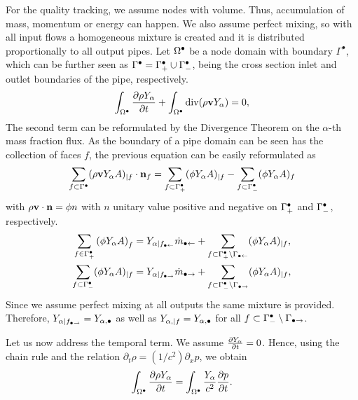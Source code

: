 For the quality tracking, we assume nodes with volume. Thus, accumulation of mass, momentum or energy can happen. We also assume perfect mixing, so with all input flows a homogeneous mixture is created and it is distributed proportionally to all output pipes. Let $\volnode$ be a node domain with boundary $\Gamma^\bullet$, which can be further seen as $\Gamma^\bullet = \GammaIn \cup \GammaOut$, being the cross section inlet and outlet boundaries of the pipe, respectively. 
\begin{equation}
    \int_{\volnode} \frac{\partial \rho \massfrac}{\partial t}+\int_{\volnode} \mathrm{div}(\rho \mathbf{v} \massfrac) =0,
\end{equation}
The second term can be reformulated by the Divergence Theorem on the $\alpha$-th mass fraction flux. As the boundary of a pipe domain can be seen has the collection of faces $f$, the previous equation can be easily reformulated as 
\begin{equation*}
    \sum_{\face \subset \Gamma^\bullet} (\rho \mathbf{v} \massfrac A)_{|\face} \cdot \normal_\face=\sum_{\face \subset \GammaIn} (\phi \massfrac A)_{|\face}-\sum_{\face \subset \GammaOut} (\phi \massfrac A)_{\face} 
\end{equation*}
with $\rho \mathbf{v} \cdot \normal = \phi n$ with $n$ unitary value positive and negative on $\GammaIn$ and $\GammaOut$, respectively.
\begin{align*}
    \sum_{\face \in \GammaIn} {(\phi  \massfrac A) }_{\face}  & = \massfrac[\alpha|\faceInject]\dot{m}_{\bullet \leftarrow} + \sum_{\face \subset \GammaIn\setminus \GammaInject} (\phi \massfrac A)_{|\face},  \\
    \sum_{\face \subset \GammaOut} (\phi \massfrac A)_{|\face} &=\massfrac[\alpha|\faceEject]\dot{m}_{\bullet \rightarrow}+  \sum_{\face \subset \GammaOut\setminus \GammaEject}  (\phi \massfrac A)_{|\face},
\end{align*}
Since we assume perfect mixing at all outputs the same  mixture is provided. Therefore, $\massfrac[\alpha|\faceEject] = \massfrac[\alpha, \bullet]$ as well as $ \massfrac[\alpha,|\face] = \massfrac[\alpha, \bullet]$ for all $\face \subset \GammaOut\setminus \GammaEject$.

Let us now address the temporal term.  We assume $\frac{\partial \massfrac}{\partial t} = 0$. Hence, using the chain rule and the relation  $\partial_t \rho = (1/c^2)\partial_x p$, we obtain
\begin{equation*}
    \int_{\volnode} \frac{\partial \rho \massfrac}{\partial t} =   \int_{\volnode} \frac{\massfrac}{c^2} \frac{\partial p}{\partial t}.
\end{equation*}

